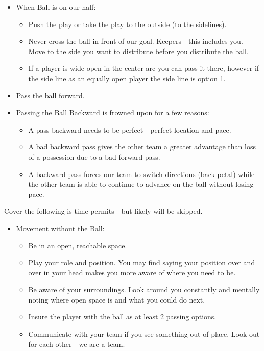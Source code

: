 \documentclass[10pt,letterpaper]{article}
\newenvironment{oddBlock}[1]{%
    \tcolorbox[beamer,%
    noparskip,breakable,
    colback=LightBlue,colframe=DarkBlue,%
    colbacklower=DarkBlue!75!LightBlue,%
    title=#1]}%
    {\endtcolorbox}
\begin{document}
\begin{oddBlock}{Basic Tactics}
    \begin{itemize}
         \item When Ball is on our half:
        \begin{itemize}
            \item Push the play or take the play to the outside (to the sidelines).
            \item Never cross the ball in front of our goal.  Keepers - this includes you.  Move to the side you want to distribute before you distribute the ball.
            \item If a player is wide open in the center arc you can pass it there, however if the side line as an equally open player the side line is option 1.
        \end{itemize}
        \item Pass the ball forward.
        \item Passing the Ball Backward is frowned upon for a few reasons:
        \begin{itemize}
            \item A pass backward needs to be perfect - perfect location and pace.
            \item A bad backward pass gives the other team a greater advantage than loss of a possession due to a bad forward pass.
            \item A backward pass forces our team to switch directions (back petal) while the other team is able to continue to advance on the ball without losing pace.
        \end{itemize}
    \end{itemize}
    Cover the following is time permits - but likely will be skipped.
    \begin{itemize}  
        \item Movement without the Ball:
        \begin{itemize}
            \item Be in an open, reachable space.
            \item Play your role and position.  You may find saying your position over and over in your head makes you more aware of where you need to be.
            \item Be aware of your surroundings. Look around you constantly and mentally noting where open space is and what you could do next.
            \item Insure the player with the ball as at least 2 passing options.
            \item Communicate with your team if you see something out of place.  Look out for each other - we are a team.
        \end{itemize}
       

\end{itemize}
\end{oddBlock}
\end{document}
